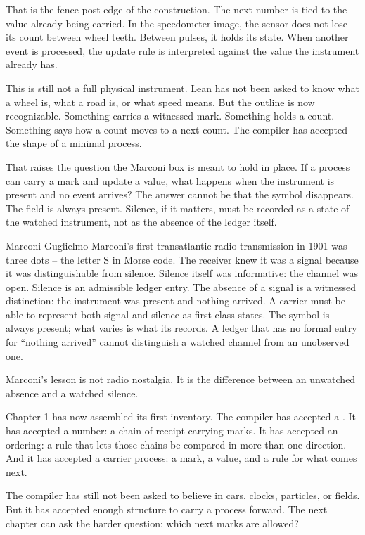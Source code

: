That is the fence-post edge of the construction. The next number is tied to the
value already being carried. In the speedometer image, the sensor does not lose
its count between wheel teeth. Between pulses, it holds its state. When another
event is processed, the update rule is interpreted against the value the
instrument already has.

This is still not a full physical instrument. Lean has not been asked to know
what a wheel is, what a road is, or what speed means. But the outline is now
recognizable. Something carries a witnessed mark. Something holds a count.
Something says how a count moves to a next count. The compiler has accepted the
shape of a minimal process.

That raises the question the Marconi box is meant to hold in place. If a process
can carry a mark and update a value, what happens when the instrument is
present and no event arrives? The answer cannot be that the symbol disappears.
The  field is always present. Silence, if it matters, must be
recorded as a state of the watched instrument, not as the absence of the ledger
itself.

\begin{gphenom}{Marconi}
\label{ph:marconi}
\GPhObs Guglielmo Marconi's first transatlantic radio transmission in 1901
was three dots -- the letter S in Morse code. The receiver knew it was
a signal because it was distinguishable from silence. Silence itself
was informative: the channel was open.
\GPhCon Silence is an admissible ledger entry. The absence of a signal is
a witnessed distinction: the instrument was present and nothing arrived.
\GPhSeq A carrier must be able to represent both signal and silence as
first-class states. The symbol is always present; what varies is what
its  records. A ledger that has no formal entry for
``nothing arrived'' cannot distinguish a watched channel from an
unobserved one.
\end{gphenom}

Marconi's lesson is not radio nostalgia. It is the difference between an
unwatched absence and a watched silence.

Chapter 1 has now assembled its first inventory. The compiler has accepted a
. It has accepted a number: a chain of receipt-carrying marks. It
has accepted an ordering: a rule that lets those chains be compared in more
than one direction. And it has accepted a carrier process: a mark, a value, and
a rule for what comes next.

The compiler has still not been asked to believe in cars, clocks, particles, or
fields. But it has accepted enough structure to carry a process forward. The
next chapter can ask the harder question: which next marks are allowed?


